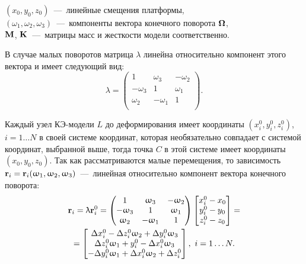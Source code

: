 \noindent
$ (x_0, y_0, z_0) $~---~линейные смещения платформы, \\
$ (\omega_1, \omega_2, \omega_3) $~---~компоненты вектора конечного поворота $ \mathbf{\Omega} $, \\
$ \mathbf{M} $, $ \mathbf{K} $~---~матрицы масс и жесткости модели соответственно.

В случае малых поворотов матрица $ \lambda $ линейна относительно компонент этого вектора и имеет следующий вид:
\begin{equation}
	\lambda =
	\begin{pmatrix}
		1 & \omega_3 & -\omega_2 \\
		-\omega_3 & 1 & \omega_1 \\
		\omega_2 & -\omega_1 & 1 \\
	\end{pmatrix}.
\end{equation}

Каждый узел КЭ-модели $ L $ до деформирования имеет координаты $ (x_i^0, y_i^0, z_i^0) $, $ i = 1 \hdots N $ в своей системе координат, которая необязательно совпадает с системой координат, выбранной выше, тогда точка $ C $ в этой системе имеет координаты $ (x_0, y_0, z_0) $. Так как рассматриваются малые перемещения, то зависимость $ \mathbf{r}_i = \mathbf{r}_i (\upomega_1, \upomega_2, \upomega_3) $~---~линейная относительно компонент вектора конечного поворота:
\begin{gather}
    \mathbf{r}_i = \uplambda \mathbf{r}_i^0 =
    \begin{pmatrix}
    1 & \upomega_3 & -\upomega_2 \\
    -\upomega_3 & 1 & \upomega_1 \\
    \upomega_2 & -\upomega_1 & 1 \\
    \end{pmatrix}
    \begin{bmatrix}
        x_i^0 - x_0 \\
        y_i^0 - y_0 \\
        z_i^0 - z_0 \\
    \end{bmatrix} = \nonumber \\
    = \begin{bmatrix}
    \Delta x_i^0 - \Delta z_i^0 \upomega_2 + \Delta y_i^0 \upomega_3 \\
    \Delta z_i^0 \upomega_1 + y_i^0 - \Delta x_i^0 \upomega_3 \\
    -\Delta y_i^0 \upomega_1 + \Delta x_i^0 \upomega_2 + \Delta z_i^0 \\
    \end{bmatrix}
    , \ i = 1 \hdots N.
    \label{eq:rotVecLin}
\end{gather}

